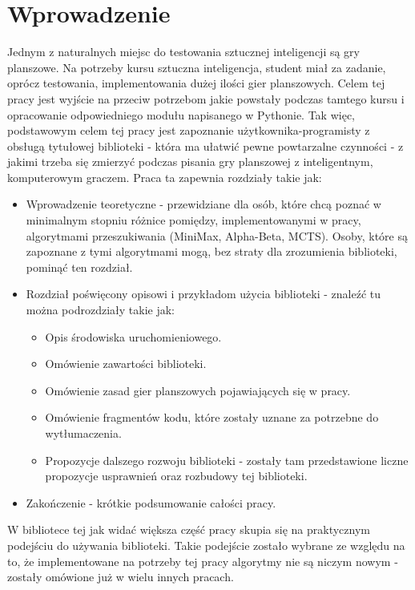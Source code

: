 \documentclass[polish,shortabstract,inz]{iithesis}
\author         {Mikołaj Kowalik}
\begin{document}

\chapter{Wprowadzenie}
Jednym z naturalnych miejsc do testowania sztucznej inteligencji są gry planszowe.
Na potrzeby kursu sztuczna inteligencja, student miał za zadanie, oprócz testowania, implementowania dużej ilości gier planszowych.
Celem tej pracy jest wyjście na przeciw potrzebom jakie powstały podczas tamtego kursu i opracowanie odpowiedniego modułu napisanego w Pythonie.
Tak więc, podstawowym celem tej pracy jest zapoznanie użytkownika-programisty z obsługą tytułowej biblioteki - która ma ułatwić pewne powtarzalne czynności - z jakimi trzeba się zmierzyć podczas pisania gry planszowej z inteligentnym, komputerowym graczem.
Praca ta zapewnia rozdziały takie jak:
\begin{itemize}
  \item Wprowadzenie teoretyczne - przewidziane dla osób, które chcą poznać w minimalnym stopniu różnice pomiędzy, implementowanymi w pracy, algorytmami przeszukiwania (MiniMax, Alpha-Beta, MCTS). Osoby, które są zapoznane z tymi algorytmami mogą, bez straty dla zrozumienia biblioteki, pominąć ten rozdział.
  \item Rozdział poświęcony opisowi i przykładom użycia biblioteki - znaleźć tu można podrozdziały takie jak:
    \begin{itemize}
      \item Opis środowiska uruchomieniowego.
      \item Omówienie zawartości biblioteki.
      \item Omówienie zasad gier planszowych pojawiających się w pracy.
      \item Omówienie fragmentów kodu, które zostały uznane za potrzebne do wytłumaczenia.
      \item Propozycje dalszego rozwoju biblioteki - zostały tam przedstawione liczne propozycje usprawnień oraz rozbudowy tej biblioteki.
    \end{itemize}
  \item Zakończenie - krótkie podsumowanie całości pracy.
\end{itemize}

W bibliotece tej jak widać większa część pracy skupia się na praktycznym podejściu do używania biblioteki.
Takie podejście zostało wybrane ze względu na to, że implementowane na potrzeby tej pracy algorytmy nie są niczym nowym - zostały omówione już w wielu innych pracach.
\end{document}
